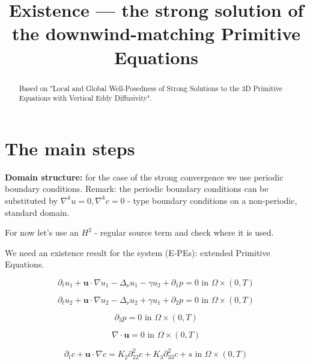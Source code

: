 \documentclass[11pt]{article}
\title{Existence --- the strong solution of the downwind-matching Primitive Equations}
\date{}
\begin{document}
\maketitle

\begin{abstract}

Based on "Local and Global Well-Posedness of Strong Solutions to the 3D Primitive Equations with Vertical Eddy Diffusivity".

\end{abstract}

\newpage
\tableofcontents
\newpage

\section{The main steps}

\textbf{Domain structure:} for the case of the strong convergence we use periodic boundary conditions. Remark: the periodic boundary conditions can be substituted by $\nabla^k u = 0, \nabla^k c = 0$ - type boundary conditions on a non-periodic, standard domain.

For now let's use an $H^2$ - regular source term and check where it is used.

We need an existence result for the system (E-PEs): extended Primitive Equations.

    \begin{equation} \label{HNSC1-dw}    
    \partial_t u_1 + \mathbf{u} \cdot \nabla u_1 - \Delta_\nu u_1 - \gamma u_2 + \partial_1 p = 0 \text{ in } \Omega \times (0,T)
    \end{equation}
    
    \begin{equation} \label{HNSC2-dw}   
    \partial_t u_2 + \mathbf{u} \cdot \nabla u_2 - \Delta_\nu u_2 + \gamma u_1 + \partial_2 p = 0 \text{ in } \Omega \times (0,T)
    \end{equation}
    
    \begin{equation} \label{HNSC3-dw}   
    \partial_3 p = 0 \text{ in } \Omega \times (0,T)
    \end{equation}
    
    \begin{equation} \label{HNSC4-dw}   
    \nabla \cdot \mathbf{u} = 0 \text{ in } \Omega \times (0,T)
    \end{equation}
    
    \begin{equation} \label{HNSC5-dw}   
    \partial_t c + \mathbf{u} \cdot \nabla c = K_2 \partial_{22} ^ 2 c + K_3 \partial_{33} ^2 c + s \text{ in } \Omega \times (0,T)
    \end{equation}
    
\end{document}
